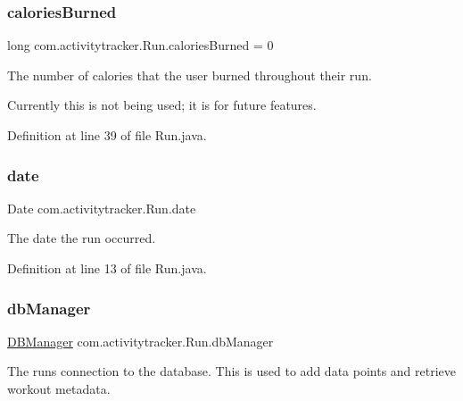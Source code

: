 \subsubsection{\texorpdfstring{calories\+Burned}{caloriesBurned}}
{\footnotesize\ttfamily long com.\+activitytracker.\+Run.\+calories\+Burned = 0\hspace{0.3cm}{\ttfamily [package]}}

The number of calories that the user burned throughout their run.

Currently this is not being used; it is for future features. 

Definition at line 39 of file Run.\+java.

\mbox{\label{classcom_1_1activitytracker_1_1_run_a66934b1f4fe6bc74a4e98574a2892764}} 
\subsubsection{\texorpdfstring{date}{date}}
{\footnotesize\ttfamily Date com.\+activitytracker.\+Run.\+date\hspace{0.3cm}{\ttfamily [package]}}

The date the run occurred. 

Definition at line 13 of file Run.\+java.

\mbox{\label{classcom_1_1activitytracker_1_1_run_ab90e32eda9f4c671ae3575f971edca6b}} 
\subsubsection{\texorpdfstring{db\+Manager}{dbManager}}
{\footnotesize\ttfamily \mbox{\hyperlink{classcom_1_1activitytracker_1_1_d_b_manager}{D\+B\+Manager}} com.\+activitytracker.\+Run.\+db\+Manager\hspace{0.3cm}{\ttfamily [package]}}

The run\textquotesingle{}s connection to the database. This is used to add data points and retrieve workout metadata. 

